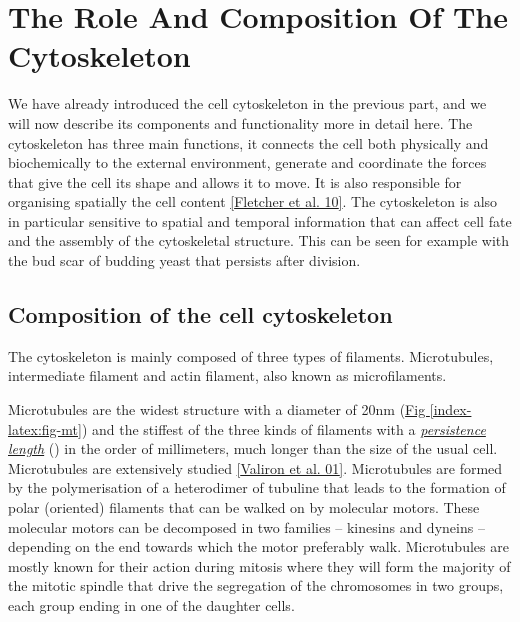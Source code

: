 \documentclass[A4paperpaper,11pt,english]{sphinxmanual}
\begin{document}
\section{The Role And Composition Of The Cytoskeleton}
\label{index-latex:the-role-and-composition-of-the-cytoskeleton}\label{index-latex:role-of-actin}
We have already introduced the cell cytoskeleton in the previous part, and we will now
describe its components and functionality more in detail here.  The cytoskeleton
has three main functions, it connects the cell both physically
and biochemically to the external environment, generate and coordinate the
forces that give the cell its shape and allows it to move. It is also
responsible for organising spatially  the cell content {\hyperref[index-latex:fletcher2010]{{[}Fletcher et al. 10{]}}}.
The cytoskeleton is also in particular sensitive to spatial and temporal
information that can affect cell fate and the assembly of the cytoskeletal
structure. This can be seen for example with the bud scar of budding yeast that
persists after division.


\subsection{Composition of the cell cytoskeleton}
\label{index-latex:composition-of-the-cell-cytoskeleton}
The cytoskeleton is mainly composed of three types of filaments.
Microtubules, intermediate filament and actin filament, also known as
microfilaments.

Microtubules are the widest structure with a diameter of 20nm (\hyperref[index-latex:fig-mt]{Fig  \ref*{index-latex:fig-mt}})
and the
stiffest of the three kinds of filaments with a {\hyperref[index-latex:viscoelastic]{\emph{persistence length}}} () in the order
of millimeters, much longer than the size of the usual cell.
Microtubules are extensively studied {\hyperref[index-latex:valiron2001]{{[}Valiron et al. 01{]}}}.
Microtubules are formed by the polymerisation of a heterodimer of tubuline
that leads to the formation of polar (oriented) filaments that can be walked on
by molecular motors. These molecular motors can be decomposed in two families –
kinesins and dyneins – depending on the end towards which the motor preferably
walk.  Microtubules are mostly known for their action during mitosis
where they will form the majority of the mitotic spindle that drive the segregation
of the chromosomes in two groups, each group ending in one of the daughter
cells.
\end{document}
